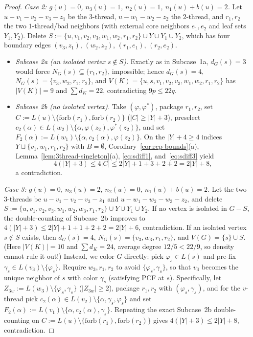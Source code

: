 \documentclass[11pt,a4paper]{article}
\theoremstyle{definition}
\begin{document}
\begin{proof}
\emph{Case 2: $g(u) = 0$, $n_3(u) = 1$, $n_2(u) = 1$, $n_1(u) + b(u) = 2$.}
Let $u - v_1 - v_2 - v_3 - z_1$ be the $3$-thread, $u - w_1 - w_2 - z_2$ the $2$-thread, and $r_1, r_2$ the two $1$-thread/bad neighbors (with external core neighbors $e_1, e_2$ and leaf sets $Y_1, Y_2$). Delete $S := \{u, v_1, v_2, v_3, w_1, w_2, r_1, r_2\} \cup Y \cup Y_1 \cup Y_2$, which has four boundary edges $(v_3, z_1)$, $(w_2, z_2)$, $(r_1, e_1)$, $(r_2, e_2)$.
\begin{itemize}[leftmargin=*,itemsep=2pt]
  \item \emph{Subcase 2a (an isolated vertex $s \notin S$).} Exactly as in Subcase~1a, $d_G(s) = 3$ would force $N_G(s) \subseteq \{r_1, r_2\}$, impossible; hence $d_G(s) = 4$, $N_G(s) = \{v_3, w_2, r_1, r_2\}$, and $V(K) = \{u, s, v_1, v_2, v_3, w_1, w_2, r_1, r_2\}$ has $|V(K)| = 9$ and $\sum d_K = 22$, contradicting $9p \le 22q$.
  \item \emph{Subcase 2b (no isolated vertex).} Take $(\varphi, \varphi^*)$, package $r_1, r_2$, set $C := L(u) \setminus \{\mathrm{forb}(r_1), \mathrm{forb}(r_2)\}$ ($|C| \ge |Y| + 3$), preselect $c_2(\alpha) \in L(w_2) \setminus \{\alpha, \varphi(z_2), \varphi^*(z_2)\}$, and set $F_2(\alpha) := L(w_1) \setminus \{\alpha, c_2(\alpha), \varphi(z_2)\}$. On the $|Y|+4 \ge 4$ indices $Y \sqcup \{v_1, w_1, r_1, r_2\}$ with $B = \emptyset$, Corollary~\ref{cor:rep-bounds}(a), Lemma~\ref{lem:3thread-singleton}(a), \eqref{eq:sdiff1}, and~\eqref{eq:sdiff3} yield
  \[
    4(|Y| + 3) \le 4|C| \le 2|Y| + 1 + 3 + 2 + 2 = 2|Y| + 8,
  \]
  a contradiction.
\end{itemize}

\emph{Case 3: $g(u) = 0$, $n_3(u) = 2$, $n_2(u) = 0$, $n_1(u) + b(u) = 2$.}
Let the two $3$-threads be $u - v_1 - v_2 - v_3 - z_1$ and $u - w_1 - w_2 - w_3 - z_2$, and delete $S := \{u, v_1, v_2, v_3, w_1, w_2, w_3, r_1, r_2\} \cup Y \cup Y_1 \cup Y_2$.
If no vertex is isolated in $G - S$, the double-counting of Subcase~2b improves to $4(|Y|+3) \le 2|Y| + 1 + 1 + 2 + 2 = 2|Y| + 6$, contradiction.
If an isolated vertex $s \notin S$ exists, then $d_G(s) = 4$, $N_G(s) = \{v_3, w_3, r_1, r_2\}$, and $V(G) = \{s\} \cup S$. (Here $|V(K)| = 10$ and $\sum d_K = 24$, average degree $12/5 < 22/9$, so density cannot rule it out!) Instead, we color $G$ directly: pick $\varphi_s \in L(s)$ and pre-fix $\gamma_s \in L(v_3) \setminus \{\varphi_s\}$. Require $w_3, r_1, r_2$ to avoid $\{\varphi_s, \gamma_s\}$, so that $v_3$ becomes the unique neighbor of $s$ with color $\gamma_s$ (satisfying PCF at $s$). Specifically, let $Z_{3w} := L(w_3) \setminus \{\varphi_s, \gamma_s\}$ ($|Z_{3w}| \ge 2$), package $r_1, r_2$ with $(\varphi_s, \gamma_s)$, and for the $v$-thread pick $c_2(\alpha) \in L(v_2) \setminus \{\alpha, \gamma_s, \varphi_s\}$ and set $F_2(\alpha) := L(v_1) \setminus \{\alpha, c_2(\alpha), \gamma_s\}$. Repeating the exact Subcase~2b double-counting on $C := L(u) \setminus \{\mathrm{forb}(r_1), \mathrm{forb}(r_2)\}$ gives $4(|Y|+3) \le 2|Y| + 8$, contradiction.
\end{proof}
\end{document}
